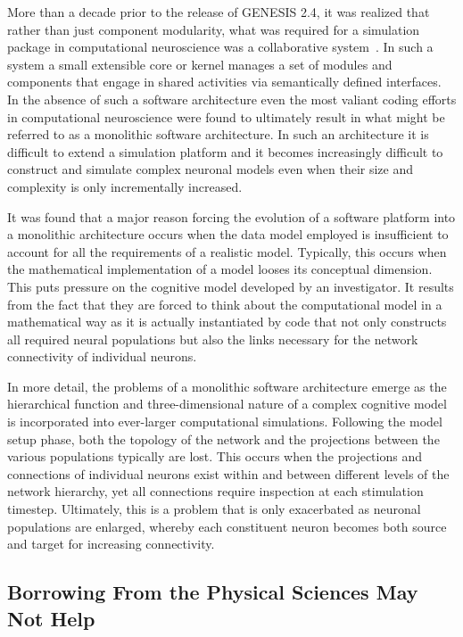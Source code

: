 \documentclass[11pt,3p,twocolumn]{JMN}
\begin{document}
More than a decade prior to the release of GENESIS 2.4, it was realized that rather than just component modularity, what was required for a simulation package in computational neuroscience was a collaborative system~\citep{cornelis03}. In such a system a small extensible core or kernel manages a set of modules and components that engage in shared activities via semantically defined interfaces. In the absence of such a software architecture even the most valiant coding efforts in computational neuroscience were found to ultimately result in what might be referred to as a monolithic software architecture. In such an architecture it is difficult to extend a simulation platform and it becomes increasingly difficult to construct and simulate complex neuronal models even when their size and complexity is only incrementally increased.

It was found that a major reason forcing the evolution of a software platform into a monolithic architecture occurs when the data model employed is insufficient to account for all the requirements of a realistic model. Typically, this occurs when the mathematical implementation of a model looses its conceptual dimension. This puts pressure on the cognitive model developed by an investigator. It results from the fact that they are forced to think about the computational model in a mathematical way as it is actually instantiated by code that not only constructs all required neural populations but also the links necessary for the network connectivity of individual neurons.

In more detail, the problems of a monolithic software architecture emerge as the hierarchical function and three-dimensional nature of a complex cognitive model is incorporated into ever-larger computational simulations. Following the model setup phase, both the topology of the network and the projections between the various populations typically are lost. This occurs when the projections and connections of individual neurons exist within and between different levels of the network hierarchy, yet all connections require inspection at each stimulation timestep. Ultimately, this is a problem that is only exacerbated as neuronal populations are enlarged, whereby each constituent neuron becomes both source and target for increasing connectivity.

\subsection{Borrowing From the Physical Sciences May Not Help}
\end{document}
